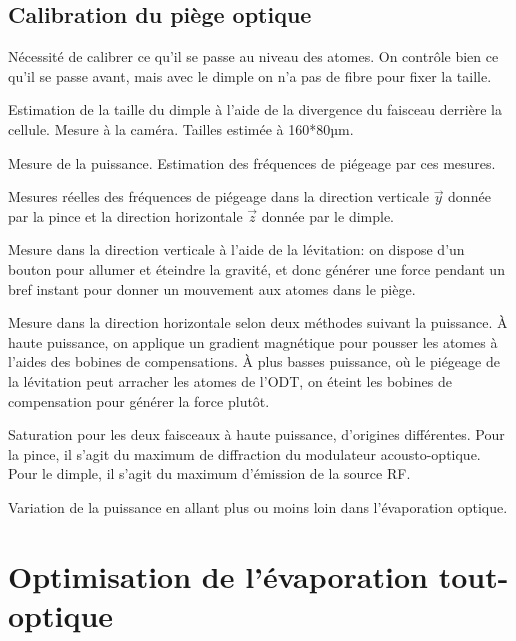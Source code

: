 \subsection{Calibration du piège optique}
Nécessité de calibrer ce qu'il se passe au niveau des atomes. On contrôle bien ce qu'il se passe avant, mais avec le dimple on n'a pas de fibre pour fixer la taille. 

Estimation de la taille du dimple à l'aide de la divergence du faisceau derrière la cellule. Mesure à la caméra. Tailles estimée à 160*80µm. 

Mesure de la puissance. Estimation des fréquences de piégeage par ces mesures.

Mesures réelles des fréquences de piégeage dans la direction verticale $\vec{y}$ donnée par la pince et la direction horizontale $\vec{z}$ donnée par le dimple.

Mesure dans la direction verticale à l'aide de la lévitation: on dispose d'un bouton pour allumer et éteindre la gravité, et donc générer une force pendant un bref instant pour donner un mouvement aux atomes dans le piège.

Mesure dans la direction horizontale selon deux méthodes suivant la puissance. À haute puissance, on applique un gradient magnétique pour pousser les atomes à l'aides des bobines de compensations. À plus basses puissance, où le piégeage de la lévitation peut arracher les atomes de l'ODT, on éteint les bobines de compensation pour générer la force plutôt. 

Saturation pour les deux faisceaux à haute puissance, d'origines différentes. Pour la pince, il s'agit du maximum de diffraction du modulateur acousto-optique. Pour le dimple, il s'agit du maximum d'émission de la source RF. 

Variation de la puissance en allant plus ou moins loin dans l'évaporation optique.


\section{Optimisation de l'évaporation tout-optique}
\label{sc:evap_optique}

